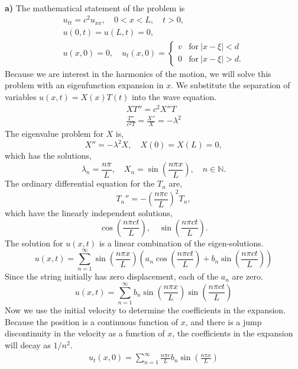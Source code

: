 {%
\begin{Solution}
  \label{solution piano string instantaneously struck}
  $\phantom{a}$

  \textbf{a)}
  The mathematical statement of the problem is
  \begin{gather*}
    u_{t t} = c^2 u_{x x}, \quad 0 < x < L, \quad t > 0, \\
    u(0, t) = u(L, t) = 0, \\
    u(x, 0) = 0, \quad u_t(x, 0) = 
    \begin{cases}
      v &\mathrm{for}\ |x-\xi| < d \\
      0 &\mathrm{for}\ |x-\xi| > d.
    \end{cases}
  \end{gather*}
  Because we are interest in the harmonics of the motion,
  we will solve this problem with an eigenfunction expansion in $x$.  We 
  substitute the separation of variables $u(x, t) = X(x) T(t)$ into the wave
  equation.
  \begin{gather*}
    X T'' = c^2 X'' T \\
    \frac{ T'' }{ c^2 T } = \frac{X''}{X} = - \lambda^2
  \end{gather*}
  The eigenvalue problem for $X$ is,
  \[
  X'' = - \lambda^2 X, \quad X(0) = X(L) = 0,
  \]
  which has the solutions,
  \[
  \lambda_n = \frac{n \pi}{L}, \quad X_n = \sin\left( \frac{n \pi x}{L} \right),
  \quad n \in \mathbb{N}.
  \]
  The ordinary differential equation for the $T_n$ are,
  \[
  T_n'' = - \left( \frac{n \pi c}{L} \right)^2 T_n,
  \]
  which have the linearly independent solutions,
  \[
  \cos\left( \frac{n \pi c t}{L} \right), \quad
  \sin\left( \frac{n \pi c t}{L} \right).
  \]
  The solution for $u(x,t)$ is a linear combination of the eigen-solutions.
  \[
  u(x, t) = \sum_{n=1}^\infty \sin\left( \frac{n \pi x}{L} \right) \left(
    a_n \cos\left( \frac{n \pi c t}{L} \right)
    + b_n \sin\left( \frac{n \pi c t}{L} \right) \right)
  \]
  Since the string initially has zero displacement, each of the $a_n$ are zero.
  \[
  u(x, t) = \sum_{n=1}^\infty b_n \sin\left( \frac{n \pi x}{L} \right) 
  \sin\left( \frac{n \pi c t}{L} \right)
  \]
  Now we use the initial velocity to determine the coefficients in the expansion.
  Because the position is a continuous function of $x$, and there is a jump
  discontinuity in the velocity as a function of $x$, the coefficients in the
  expansion will decay as $1/n^2$.
  \begin{gather*}
    u_t(x, 0) = \sum_{n=1}^\infty \frac{n \pi c}{L} b_n \sin\left( \frac{n \pi x}{L}\right)

\end{gather*}
\end{Solution}}
